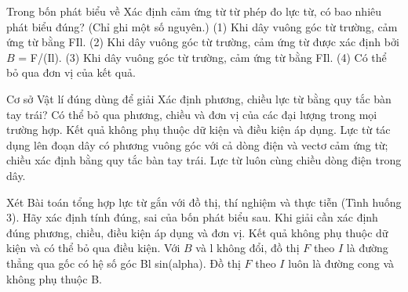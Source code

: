 \begin{ex}
Trong bốn phát biểu về Xác định cảm ứng từ từ phép đo lực từ, có bao nhiêu phát biểu đúng? (Chỉ ghi một số nguyên.) (1) Khi dây vuông góc từ trường, cảm ứng từ bằng FIl. (2) Khi dây vuông góc từ trường, cảm ứng từ được xác định bởi $B$ = F/(Il). (3) Khi dây vuông góc từ trường, cảm ứng từ bằng FIl. (4) Có thể bỏ qua đơn vị của kết quả.
\end{ex}

\begin{ex}
Cơ sở Vật lí đúng dùng để giải Xác định phương, chiều lực từ bằng quy tắc bàn tay trái?
\choice
{Có thể bỏ qua phương, chiều và đơn vị của các đại lượng trong mọi trường hợp.}
{Kết quả không phụ thuộc dữ kiện và điều kiện áp dụng.}
{\True Lực từ tác dụng lên đoạn dây có phương vuông góc với cả dòng điện và vectơ cảm ứng từ; chiều xác định bằng quy tắc bàn tay trái.}
{Lực từ luôn cùng chiều dòng điện trong dây.}
\end{ex}

\begin{ex}
Xét Bài toán tổng hợp lực từ gắn với đồ thị, thí nghiệm và thực tiễn (Tình huống 3). Hãy xác định tính đúng, sai của bốn phát biểu sau.
\choiceTF
{\True Khi giải cần xác định đúng phương, chiều, điều kiện áp dụng và đơn vị.}
{Kết quả không phụ thuộc dữ kiện và có thể bỏ qua điều kiện.}
{\True Với $B$ và l không đổi, đồ thị $F$ theo $I$ là đường thẳng qua gốc có hệ số góc Bl sin(alpha).}
{Đồ thị $F$ theo $I$ luôn là đường cong và không phụ thuộc B.}
\end{ex}

